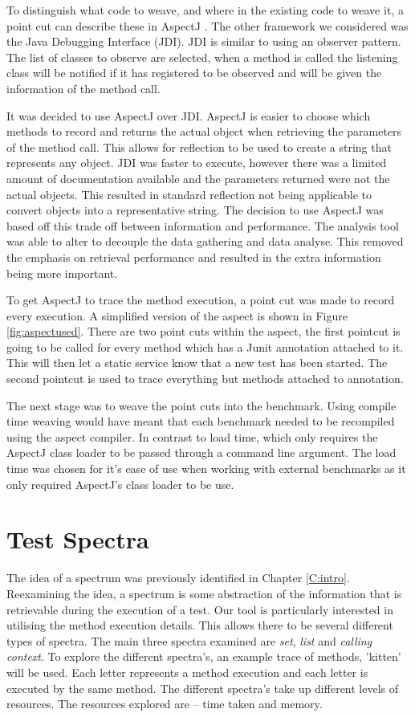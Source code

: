 To distinguish what code to weave, and where in the existing code to weave it, a point cut can describe these in AspectJ \cite{aspectwiki}. The other framework we considered was the Java Debugging Interface (JDI). JDI is similar to using an observer pattern. The list of classes to observe are selected, when a method is called the listening class will be notified if it has registered to be observed and will be given the information of the method call. 

It was decided to use AspectJ over JDI. AspectJ is easier to choose which methods to record and returns the actual object when retrieving the parameters of the method call. This allows for reflection to be used to create a string that represents any object. JDI was faster to execute, however there was a limited amount of documentation available and the parameters returned were not the actual objects. This resulted in standard reflection not being applicable to convert objects into a representative string. The decision to use AspectJ was based off this trade off between information and performance. The analysis tool was able to alter to decouple the data gathering and data analyse. This removed the emphasis on retrieval performance and resulted in the extra information being more important.

To get AspectJ to trace the method execution, a point cut was made to record every execution. A simplified version of the aspect is shown in Figure \ref{fig:aspectused}. There are two point cuts within the aspect, the first pointcut is going to be called for every method which has a Junit \@Test annotation attached to it. This will then let a static service know that a new test has been started. The second pointcut is used to trace everything but methods attached to \@Test annotation. 

The next stage was to weave the point cuts into the benchmark. Using compile time weaving would have meant that each benchmark needed to be recompiled using the aspect compiler. In contrast to load time, which only requires the AspectJ class loader to be passed through a command line argument. The load time was chosen for it's ease of use when working with external benchmarks as it only required AspectJ's class loader to be use.


\section{Test Spectra}
\label{S:spectra}
The idea of a spectrum was previously identified in Chapter \ref{C:intro}. Reexamining the idea, a spectrum is some abstraction of the information that is retrievable during the execution of a test. Our tool is particularly interested in utilising the method execution details. This allows there to be several different types of spectra. The main three spectra examined are \textit{set}, \textit{list} and \textit{calling context}. To explore the different spectra's, an example trace of methods, 'kitten' will be used. Each letter represents a method execution and each letter is executed by the same method. The different spectra's take up different levels of resources. The resources explored are -- time taken and memory. 

